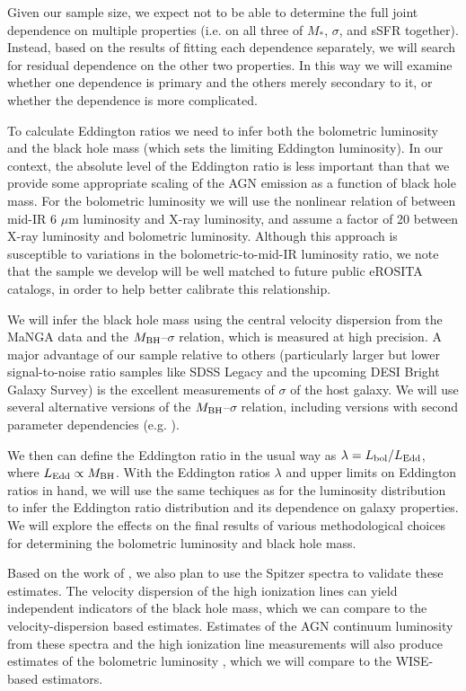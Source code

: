 \documentclass[12pt, preprint]{hacked-aastex}
\begin{document}
Given our sample size, we expect not to be able to determine the full
joint dependence on multiple properties (i.e. on all three of
$M_\ast$, $\sigma$, and sSFR together). Instead, based on the results
of fitting each dependence separately, we will search for residual
dependence on the other two properties. In this way we will examine
whether one dependence is primary and the others merely secondary to
it, or whether the dependence is more complicated.

To calculate Eddington ratios we need to infer both the bolometric
luminosity and the black hole mass (which sets the limiting Eddington
luminosity). In our context, the absolute level of the Eddington ratio
is less important than that we provide some appropriate scaling of the
AGN emission as a function of black hole mass.  For the bolometric
luminosity we will use the nonlinear relation of \cite{stern15a}
between mid-IR 6 $\mu$m luminosity and X-ray luminosity, and assume a
factor of 20 between X-ray luminosity and bolometric
luminosity. Although this approach is susceptible to variations in the
bolometric-to-mid-IR luminosity ratio, we note that the sample we
develop will be well matched to future public eROSITA catalogs, in
order to help better calibrate this relationship.

We will infer the black hole mass using the central velocity
dispersion from the MaNGA data and the $M_{\rm BH}$--$\sigma$
relation, which is measured at high precision.  A major advantage of
our sample relative to others (particularly larger but lower
signal-to-noise ratio samples like SDSS Legacy and the upcoming DESI
Bright Galaxy Survey) is the excellent measurements of $\sigma$ of the
host galaxy. We will use several alternative versions of the $M_{\rm
  BH}$--$\sigma$ relation, including versions with second parameter
dependencies (e.g. \cite{beifiori12a, kormendy13a, vandenbosch16a, shankar19a}).

We then can define the Eddington ratio in the usual way as $\lambda =
L_{\rm bol} / L_{\rm Edd}$, where $L_{\rm Edd}\propto M_{\rm BH}$.
With the Eddington ratios $\lambda$ and upper limits on Eddington
ratios in hand, we will use the same techiques as for the luminosity
distribution to infer the Eddington ratio distribution and its
dependence on galaxy properties. We will explore the effects on the
final results of various methodological choices for determining the
bolometric luminosity and black hole mass.

Based on the work of \cite{dasyra08a}, we also plan to use the Spitzer
spectra to validate these estimates.  The velocity dispersion of the
high ionization lines can yield independent indicators of the black
hole mass, which we can compare to the velocity-dispersion based
estimates. Estimates of the AGN continuum luminosity from these
spectra and the high ionization line measurements will also produce
estimates of the bolometric luminosity \cite{dasyra08a, shen20a},
which we will compare to the WISE-based estimators.
\end{document}
